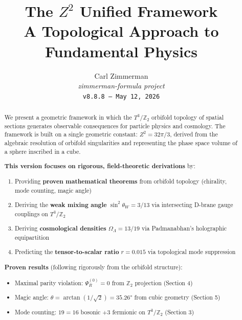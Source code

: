 \documentclass[12pt,a4paper]{article}
\newcommand{\Ztwo}{\mathbb{Z}_2}
\newcommand{\Tthree}{T^3}
\newcommand{\OmegaL}{\Omega_\Lambda}
\newcommand{\sinW}{\sin^2\theta_W}
\newcommand{\Zsq}{Z^2}
\begin{document}
\title{\textbf{The $Z^2$ Unified Framework}\\[0.5em]
\large A Topological Approach to Fundamental Physics}

\author{Carl Zimmerman\\[0.5em]
\small\textit{zimmerman-formula project}\\
\small\texttt{v8.8.8 --- May 12, 2026}}

\date{}

\maketitle

\begin{abstract}

We present a geometric framework in which the $\Tthree/\Ztwo$ orbifold topology of spatial sections generates observable consequences for particle physics and cosmology. The framework is built on a single geometric constant: $\Zsq = 32\pi/3$, derived from the algebraic resolution of orbifold singularities and representing the phase space volume of a sphere inscribed in a cube.

\textbf{This version focuses on rigorous, field-theoretic derivations} by:
\begin{enumerate}[itemsep=0pt]
    \item Providing \textbf{proven mathematical theorems} from orbifold topology (chirality, mode counting, magic angle)
    \item Deriving the \textbf{weak mixing angle} $\sinW = 3/13$ via intersecting D-brane gauge couplings on $\Tthree/\Ztwo$
    \item Deriving \textbf{cosmological densities} $\OmegaL = 13/19$ via Padmanabhan's holographic equipartition
    \item Predicting the \textbf{tensor-to-scalar ratio} $r = 0.015$ via topological mode suppression
\end{enumerate}

\textbf{Proven results} (following rigorously from the orbifold structure):
\begin{itemize}[itemsep=0pt]
    \item Maximal parity violation: $\Psi_R^{(0)} = 0$ from $\Ztwo$ projection (Section 4)
    \item Magic angle: $\theta = \arctan(1/\sqrt{2}) = 35.26°$ from cubic geometry (Section 5)
    \item Mode counting: $19 = 16$ bosonic $+ 3$ fermionic on $\Tthree/\Ztwo$ (Section 3)
\end{itemize}


\end{abstract}
\end{document}
